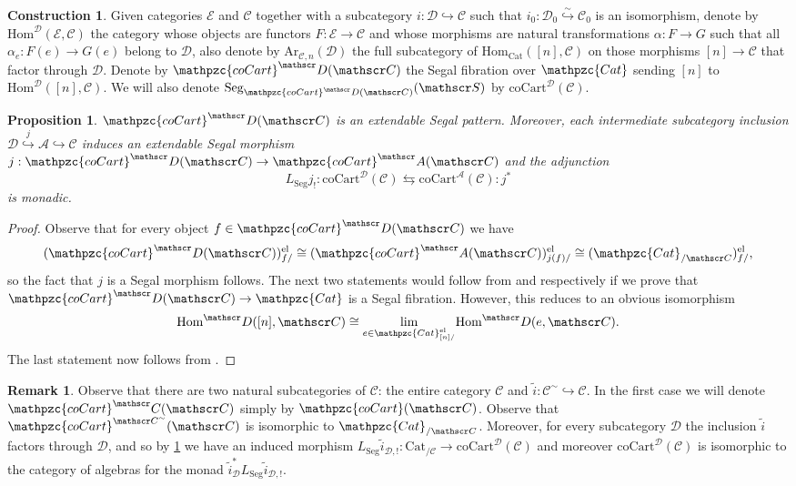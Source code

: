 \documentclass[a4paper, reqno]{amsart}
\newtheorem{prop}[theorem]{Proposition}
\theoremstyle{definition}
\newtheorem{remark}[theorem]{Remark}
\newtheorem{construction}[theorem]{Construction}
\newcommand\cA{\mathscr A}
\newcommand\cC{\mathscr C}
\newcommand\cD{\mathscr D}
\newcommand\cE{\mathscr E}
\newcommand\cS{\mathscr S}
\newcommand\mor{\mathrm{Hom}}
\newcommand\cat{\mathrm{Cat}}
\newcommand\ccat{\mathpzc{Cat}}
\newcommand\arr{\mathrm{Ar}}
\newcommand\cart{\mathrm{coCart}}
\newcommand\ccart{\mathpzc{coCart}}
\newcommand\el{\mathrm{el}}
\newcommand\seg{\mathrm{Seg}}
\begin{document}
\begin{construction}\label{constr:cart}
Given categories $\cE$ and $\cC$ together with a subcategory $i:\cD\hookrightarrow\cC$ such that $i_0:\cD_0\overset{\sim}{\hookrightarrow}\cC_0$ is an isomorphism, denote by $\mor^\cD(\cE,\cC)$ the category whose objects are functors $F:\cE\rightarrow\cC$ and whose morphisms are natural transformations $\alpha:F\rightarrow G$ such that all $\alpha_e:F(e)\rightarrow G(e)$ belong to $\cD$, also denote by $\arr_{\cC,n}(\cD)$ the full subcategory of $\mor_\cat([n],\cC)$ on those morphisms $[n]\rightarrow\cC$ that factor through $\cD$. Denote by $\ccart^\cD(\cC)$ the Segal fibration over $\ccat$ sending $[n]$ to $\mor^\cD([n],\cC)$. We will also denote $\seg_{\ccart^\cD(\cC)}(\cS)$ by $\cart^\cD(\cC)$.
\end{construction}
\begin{prop}\label{prop:cart_def}
$\ccart^\cD(\cC)$ is an extendable Segal pattern. Moreover, each intermediate subcategory inclusion $\cD\overset{j}{\hookrightarrow}\cA\hookrightarrow\cC$ induces an extendable Segal morphism $j:\ccart^\cD(\cC)\rightarrow\ccart^\cA(\cC)$ and the adjunction 
\[L_\seg j_!:\cart^\cD(\cC)\leftrightarrows\cart^\cA(\cC):j^*\]
is monadic.
\end{prop}
\begin{proof}
Observe that for every object $f\in\ccart^\cD(\cC)$ we have \[(\ccart^\cD(\cC))^\el_{f/}\cong(\ccart^\cA(\cC))^\el_{j(f)/}\cong(\ccat_{/\cC})^\el_{f/},\] 
so the fact that $j$ is a Segal morphism follows. The next two statements would follow from \cite[Proposition 9.5]{chu2019homotopy} and \cite[Corollary 9.17]{chu2019homotopy} respectively if we prove that $\ccart^\cD(\cC)\rightarrow\ccat$ is a Segal fibration. However, this reduces to an obvious isomorphism 
\[\mor^\cD([n],\cC)\cong\underset{e\in\ccat^\el_{[n]/}}{\lim} \mor^\cD(e,\cC).\]
The last statement now follows from \cite[Proposition 8.1]{chu2019homotopy}.
\end{proof}
\begin{remark}
Observe that there are two natural subcategories of $\cC$: the entire category $\cC$ and $\widetilde{i}:\cC^\sim\hookrightarrow\cC$. In the first case we will denote $\ccart^\cC(\cC)$ simply by $\ccart(\cC)$. Observe that $\ccart^{\cC^\sim}(\cC)$ is isomorphic to $\ccat_{/\cC}$. Moreover, for every subcategory $\cD$ the inclusion $\widetilde{i}$ factors through $\cD$, and so by \cref{prop:cart_def} we have an induced morphism $L_\seg \widetilde{i}_{\cD,!}:\cat_{/\cC}\rightarrow\cart^\cD(\cC)$ and moreover $\cart^\cD(\cC)$ is isomorphic to the category of algebras for the monad $\widetilde{i}^*_\cD L_\seg \widetilde{i}_{\cD,!}$.
\end{remark}
\end{document}
